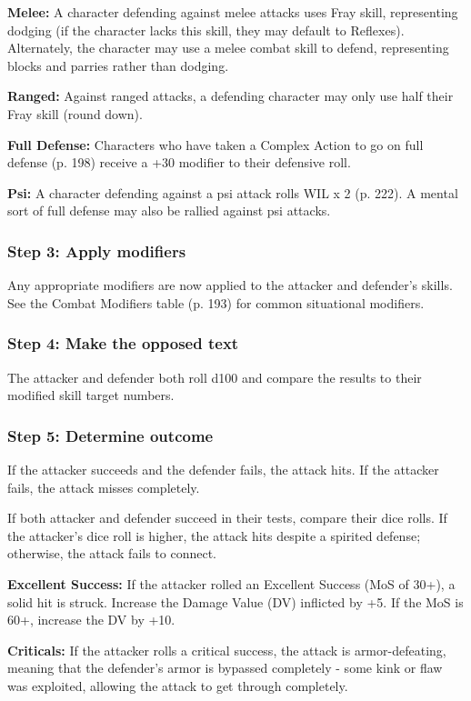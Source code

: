 \textbf{Melee:} A character defending against melee attacks uses Fray skill, representing dodging (if the character lacks this skill, they may default to Reflexes). Alternately, the character may use a melee combat skill to defend, representing blocks and parries rather than dodging.

\textbf{Ranged:} Against ranged attacks, a defending character may only use half their Fray skill (round down).

\textbf{Full Defense:} Characters who have taken a Complex Action to go on full defense (p. 198) receive a +30 modifier to their defensive roll.

\textbf{Psi:} A character defending against a psi attack rolls WIL x 2 (p. 222). A mental sort of full defense may also be rallied against psi attacks.

\subsubsection{Step 3: Apply modifiers} Any appropriate modifiers are now applied to the attacker and defender’s skills. See the Combat Modifiers table (p. 193) for common situational modifiers.

\subsubsection{Step 4: Make the opposed text} The attacker and defender both roll d100 and compare the results to their modified skill target numbers.

\subsubsection{Step 5: Determine outcome} If the attacker succeeds and the defender fails, the attack hits. If the attacker fails, the attack misses completely.

If both attacker and defender succeed in their tests, compare their dice rolls. If the attacker’s dice roll is higher, the attack hits despite a spirited defense; otherwise, the attack fails to connect.

\textbf{Excellent Success:} If the attacker rolled an Excellent Success (MoS of 30+), a solid hit is struck. Increase the Damage Value (DV) inflicted by +5. If the MoS is 60+, increase the DV by +10.

\textbf{Criticals:} If the attacker rolls a critical success, the attack is armor-defeating, meaning that the defender’s armor is bypassed completely  -  some kink or flaw was exploited, allowing the attack to get through completely.

